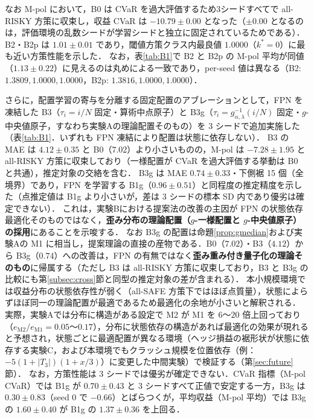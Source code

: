 \documentclass[a4paper,10pt]{jsarticle}
\theoremstyle{definition}
\begin{document}
なお M-pol において，B0 は CVaR を過大評価するため3シードすべてで all-RISKY 方策に収束し，収益 CVaR は $-10.79\pm0.00$ となった（$\pm0.00$ となるのは，評価環境の乱数シードが学習シードと独立に固定されているためである）．
B2・B2p は $1.01\pm0.01$ であり，閾値方策クラス内最良値 $1.0000$（$k^*=0$）に最も近い方策性能を示した．
なお，表\ref{tab:B1}で B2 と B2p の M-pol 平均が同値（$1.13\pm0.22$）に見えるのは丸めによる一致であり，per-seed 値は異なる（B2: $1.3809, 1.0000, 1.0000$，B2p: $1.3816, 1.0000, 1.0000$）．

さらに，配置学習の寄与を分離する固定配置のアブレーションとして，FPN を凍結した B3（$\tau_i=i/N$ 固定・算術中点原子）と B3g（$\tau_i=g^{-1}_{\alpha,\lambda}(i/N)$ 固定・$g$-中央値原子，すなわち実験Aの理論配置そのもの）を 3 シードで追加実施した（表\ref{tab:B1}．いずれも FPN 凍結により配置は状態に依存しない）．
B3 の MAE は $4.12\pm0.35$ と B0（7.02）より小さいものの，M-pol は $-7.28\pm1.95$ と all-RISKY 方策に収束しており（一様配置が CVaR を過大評価する挙動は B0 と共通），推定対象の交絡を含む．
B3g は MAE $0.74\pm0.33$・下側裾 15 個（全境界）であり，FPN を学習する B1g（$0.96\pm0.51$）と同程度の推定精度を示した（点推定値は B1g より小さいが，差は 3 シードの標本 SD 内であり優劣は確定できない）．
これは，実験Bにおける提案法の改善の主因が FPN の状態依存最適化そのものではなく，\textbf{歪み分布の理論配置（$g$-一様配置と $g$-中央値原子）の採用}にあることを示唆する．
なお B3g の配置は命題\ref{prop:gmedian}および実験Aの M1 に相当し，提案理論の直接の産物である．B0（$7.02$）・B3（$4.12$）から B3g（$0.74$）への改善は，FPN の有無ではなく\textbf{歪み重み付き量子化の理論そのもの}に帰属する（ただし B3 は all-RISKY 方策に収束しており，B3 と B3g の比較にも第\ref{subsec:cross}節と同型の推定対象の差が含まれる）．
本小規模環境では収益分布の状態依存性が弱く（all-SAFE 方策下ではほぼ点質量），状態によらずほぼ同一の理論配置が最適であるため最適化の余地が小さいと解釈される．
実際，実験Aでは分布に構造がある設定で M2 が M1 を $6$〜$20$ 倍上回っており（$e_{\mathrm{M2}}/e_{\mathrm{M1}}=0.05$〜$0.17$），分布に状態依存の構造があれば最適化の効果が現れると予想され，状態ごとに最適配置が異なる環境（ヘッジ損益の裾形状が状態に依存する実験C，および本環境でもクラッシュ規模を位置依存（例：$-5(1+|T_3|)(1+x/3)$）に変更した中間実験）で検証する（第\ref{sec:future}節）．
なお，方策性能は 3 シードでは優劣が確定できない．CVaR 指標（M-pol CVaR）では B1g が $0.70\pm0.43$ と 3 シードすべて正値で安定する一方，B3g は $0.30\pm0.83$（seed 0 で $-0.66$）とばらつくが，平均収益（M-pol 平均）では B3g の $1.60\pm0.40$ が B1g の $1.37\pm0.36$ を上回る．
\end{document}
